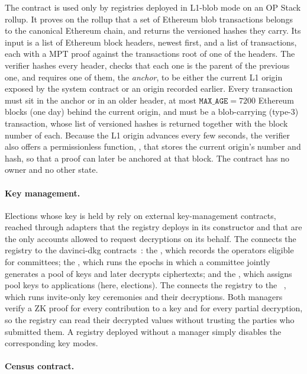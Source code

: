 The \hlset{\lblobverifier} contract is used only by registries deployed in L1-blob mode on an OP Stack rollup. It proves on the rollup that a set of Ethereum blob transactions belongs to the canonical Ethereum chain, and returns the versioned hashes they carry. Its input is a list of Ethereum block headers, newest first, and a list of transactions, each with a \ac{MPT} proof against the transactions root of one of the headers. The verifier hashes every header, checks that each one is the parent of the previous one, and requires one of them, the \emph{anchor}, to be either the current L1 origin exposed by the \lblock system contract or an origin recorded earlier. Every transaction must sit in the anchor or in an older header, at most $\texttt{MAX\_AGE} = 7200$ Ethereum blocks (one day) behind the current origin, and must be a blob-carrying (type-3) transaction, whose list of versioned hashes is returned together with the block number of each. Because the L1 origin advances every few seconds, the verifier also offers a permissionless function, , that stores the current origin's number and hash, so that a proof can later be anchored at that block. The contract has no owner and no other state.

\paragraph{Key management.}

Elections whose key is held by \keywardens rely on external key-management contracts, reached through adapters that the registry deploys in its constructor and that are the only accounts allowed to request decryptions on its behalf. The \hlset{\dkgadapter} connects the registry to the davinci-dkg contracts~\cite{davinci-dkg}: the \dkgregistry, which records the operators eligible for committees; the \dkgmanager, which runs the epochs in which a committee jointly generates a pool of keys and later decrypts ciphertexts; and the \dkgappmanager, which assigns pool keys to applications (here, elections). The \hlset{\counciladapter} connects the registry to the \councilmanager~\cite{davinci-council}, which runs invite-only key ceremonies and their decryptions. Both managers verify a \ac{ZK} proof for every contribution to a key and for every partial decryption, so the registry can read their decrypted values without trusting the parties who submitted them. A registry deployed without a manager simply disables the corresponding key modes.

\paragraph{Census contract.}

